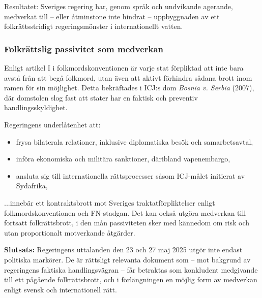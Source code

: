 \noindent
Resultatet: Sveriges regering har, genom språk och undvikande agerande, medverkat till – eller åtminstone inte hindrat – uppbyggnaden av ett folkrättsstridigt regeringsmönster i internationellt vatten.




\subsubsection{Folkrättslig passivitet som medverkan}

Enligt artikel I i folkmordskonventionen är varje stat förpliktad att inte bara avstå från att begå folkmord, utan även att aktivt förhindra sådana brott inom ramen för sin möjlighet. Detta bekräftades i ICJ:s dom \textit{Bosnia v. Serbia} (2007), där domstolen slog fast att stater har en faktisk och preventiv handlingsskyldighet.

Regeringens underlåtenhet att:

\begin{itemize}
    \item frysa bilaterala relationer, inklusive diplomatiska besök och samarbetsavtal,
    \item införa ekonomiska och militära sanktioner, däribland vapenembargo,
    \item ansluta sig till internationella rättsprocesser såsom ICJ-målet initierat av Sydafrika,
\end{itemize}


...innebär ett kontraktsbrott mot Sveriges traktatförpliktelser enligt folkmordskonventionen och FN-stadgan. Det kan också utgöra medverkan till fortsatt folkrättsbrott, i den mån passiviteten sker med kännedom om risk och utan proportionalt motverkande åtgärder.

\medskip

\textbf{Slutsats:} Regeringens uttalanden den 23 och 27 maj 2025 utgör inte endast politiska markörer. De är rättsligt relevanta dokument som – mot bakgrund av regeringens faktiska handlingsvägran – får betraktas som konkludent medgivande till ett pågående folkrättsbrott, och i förlängningen en möjlig form av medverkan enligt svensk och internationell rätt.


